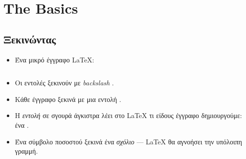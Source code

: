 \documentclass{beamer}
\begin{document}
\section{The Basics}

\subsection{Ξεκινώντας}
\begin{frame}[fragile]{\insertsubsection}
\begin{itemize}
\item Ένα μικρό έγγραφο \LaTeX{}:\en
\inputminted[frame=single]{latex}{basics.tex}\gr
\item Οι εντολές ξεκινούν με \en \emph{backslash} \keystrokebftt{\bs}.\gr
\item 
Κάθε έγγραφο ξεκινά με μια εντολή \en {}\gr.
\item Η \emph{εντολή} σε σγουρά άγκιστρα \keystrokebftt{\{} \keystrokebftt{\}} λέει στο \LaTeX{} τι είδους έγγραφο δημιουργούμε: ένα .
\item Ένα σύμβολο ποσοστού \keystrokebftt{\%} ξεκινά ένα \emph{σχόλιο} --- \LaTeX{}
θα αγνοήσει την υπόλοιπη γραμμή.
\end{itemize}
\end{frame}
\end{document}
